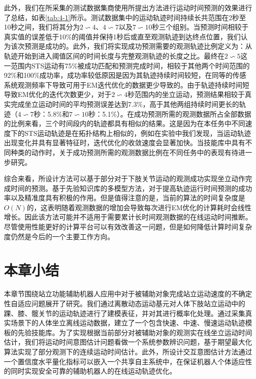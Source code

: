此外，我们在所采集的测试数据集商使用所提出方法进行运动时间预测的效果进行了总结，如表\ref{tab:4-1}所示。测试数据集中的运动轨迹时间持续长共范围在2秒至10秒之间，我们将其分为$2\backsim 4$、$4\backsim 7$以及$7\backsim 10$秒三个组别。当预测时间相较于真实值的误差低于10\%的阈值并保持1秒后或直至观测轨迹到达终点位置，我们认为该次预测是成功的。此外，我们将实现成功预测需要的观测轨迹比例定义为：从轨迹开始到进入阈值区间的时间长度与完整观测轨迹的长度之比。最终在$2\backsim 5$这一范围内STS运动有75\%被成功匹配和预测完成时间，相较于其他两个时间范围的92\%和100\%成功率，成功率较低原因是因为其轨迹持续时间较短，在同等的传感系统观测频率下导致可用于EM迭代优化的数据更少导致的。由于轨迹持续时间短导致EM优化的迭代次数更少，对于$2\backsim 4$秒范围内的坐立运动，预测结果相较于真实完成坐立运动时间的平均预测误差达到7.3\%，高于其他两组持续时间更长的轨迹（$4\backsim 7$秒：5.8\%和$7\backsim 10$秒：5.1\%）。在成功预测所需的观测数据所占全部数据的比例来看，三个时间段内的轨迹都具有相似的结果。这是因为在本任务中不同速度下的STS运动轨迹是在拓扑结构上相似的，例如在实验中我们发现，当运动轨迹出现变化并具有显著特征时，迭代优化的收敛速度会显著加快。当技能库中具有不同种类的动作时，关于成功预测所需的观测数据比例在不同任务中的表现有待进一步研究。

综合来看，所设计方法可以基于部分对于下肢关节运动的观测成功实现坐立动作完成时间的预测。基于先验知识库的多模型方法，对于提高轨迹运行时间预测的成功率以及精准度具有积极的作用。但是值得注意的是，当前的算法的时间复杂度是$O(N)$的，这表明随着观测数据的增加会导致每次进行EM优化的计算耗时会线性增长。因此该方法可能并不适用于需要累计长时间观测数据的在线运动时间推断。尽管使用性能更好的计算平台可以有效改善这一问题，但是如何降低计算时间复杂度仍然是今后的一个主要工作方向。

\section{本章小结}
本章节围绕站立功能辅助机器人应用中对于被辅助对象完成站立运动速度的不确定性自适应问题展开了研究。我们通过离散动态运动基元对人体下肢站立运动中的踝、膝、髋关节的运动轨迹进行了建模表征，并对其进行概率化处理。通过采集真实场景下的人体坐立离线运动数据，建立了一个包含快速、中速、慢速运动轨迹模板的先验技能库。为了实现根据当前部分对被辅助对象的观测实在线坐立运动时间估计，我们将运动时间意图估计问题看做一个系统参数辨识问题，基于期望最大化算法实现了部分观测下的连续运动时间估计。此外，所设计交互意图估计方法通过一个置信度水平量化指标可以嵌入一个共享自主系统中，在保证机器人个体适应性的同时实现安全可靠的辅助机器人的在线运动轨迹优化。
